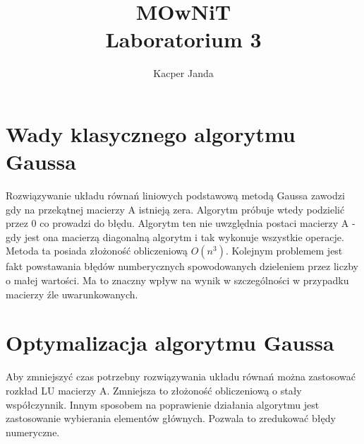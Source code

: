 \documentclass[11pt, a4paper]{article}
\begin{document}
\title{MOwNiT\\Laboratorium 3}
\author{Kacper Janda}
\date{}
\maketitle

\section{Wady klasycznego algorytmu Gaussa}
Rozwiązywanie układu równań liniowych podstawową metodą Gaussa zawodzi gdy na przekątnej macierzy A istnieją zera. Algorytm próbuje wtedy podzielić przez \begin{math} 0 \end{math} co prowadzi do błędu. Algorytm ten nie uwzględnia postaci macierzy A - gdy jest ona macierzą diagonalną algorytm i tak wykonuje wszystkie operacje. Metoda ta posiada złożoność obliczeniową \begin{math} O(n^3) \end{math}. Kolejnym problemem jest fakt powstawania błędów numberycznych spowodowanych dzieleniem przez liczby o małej wartości. Ma to znaczny wpływ na wynik w szczególności w przypadku macierzy źle uwarunkowanych.\\

\section{Optymalizacja algorytmu Gaussa}
Aby zmniejszyć czas potrzebny rozwiązywania układu równań można zastosować rozkład LU macierzy A. Zmniejsza to złożoność obliczeniową o stały współczynnik. Innym sposobem na poprawienie działania algorytmu jest zastosowanie wybierania elementów głównych. Pozwala to zredukować błędy numeryczne.\\
\end{document}
